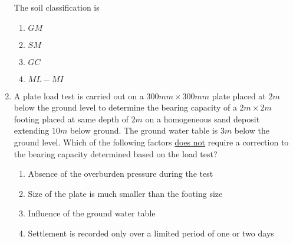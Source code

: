 \documentclass[journal]{IEEEtran}
\begin{document}
\begin{enumerate}[start=25]
\begin{center}
\end{center}
The soil classification is
\begin{enumerate}
    \item $GM$
    \item $SM$
    \item $GC$
    \item $ML-MI$
\end{enumerate}
\item A plate load test is carried out on a $300 mm \times 300 mm$ plate placed at $2 m$ below the ground level to determine the bearing capacity of a $2 m\times 2 m$ footing placed at same depth of $2 m$ on a homogeneous sand deposit extending $10 m$ below ground. The ground water table is $3 m$ below the ground level. Which of the following factors \underline{does not} require a correction to the bearing capacity determined based on the load test?
\begin{enumerate}
    \item Absence of the overburden pressure during the test
    \item Size of the plate is much smaller than the footing size
    \item Influence of the ground water table
    \item Settlement is recorded only over a limited period of one or two days
\end{enumerate}
\end{enumerate}
\end{document}
